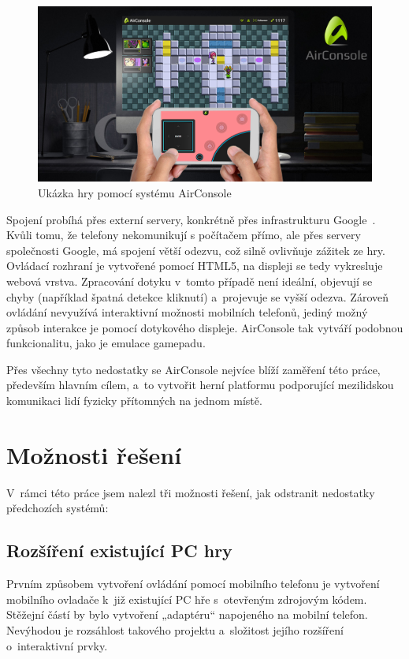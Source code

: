 \documentclass[thesis=B,czech,hidelinks]{FITthesis}[2012/06/26] %
\begin{document}
\begin{figure}[h]
\includegraphics[width=\textwidth]{airconsole}
\caption{Ukázka hry pomocí systému AirConsole~\cite{airconsole}}
\end{figure}

Spojení probíhá přes externí servery, konkrétně přes infrastrukturu Google~\cite{airconsole}. Kvůli tomu, že telefony nekomunikují s počítačem přímo, ale přes servery společnosti Google, má spojení větší odezvu, což silně ovlivňuje zážitek ze hry. Ovládací rozhraní je vytvořené pomocí HTML5, na displeji se tedy vykresluje webová vrstva. Zpracování dotyku v~tomto případě není ideální, objevují se chyby (například špatná detekce kliknutí) a~projevuje se vyšší odezva. Zároveň ovládání nevyužívá interaktivní možnosti mobilních telefonů, jediný možný způsob interakce je pomocí dotykového displeje. AirConsole tak vytváří podobnou funkcionalitu, jako je emulace gamepadu.

Přes všechny tyto nedostatky se AirConsole nejvíce blíží zaměření této práce, především hlavním cílem, a~to vytvořit herní platformu podporující mezilidskou komunikaci lidí fyzicky přítomných na jednom místě.

\section{Možnosti řešení}

V~rámci této práce jsem nalezl tři možnosti řešení, jak odstranit nedostatky předchozích systémů:

\subsection{Rozšíření existující PC hry}

Prvním způsobem vytvoření ovládání pomocí mobilního telefonu je vytvoření mobilního ovladače k~již existující PC hře s~otevřeným zdrojovým kódem. Stěžejní částí by bylo vytvoření „adaptéru“ napojeného na mobilní telefon. Nevýhodou je rozsáhlost takového projektu a~složitost jejího rozšíření o~interaktivní prvky.
\end{document}
